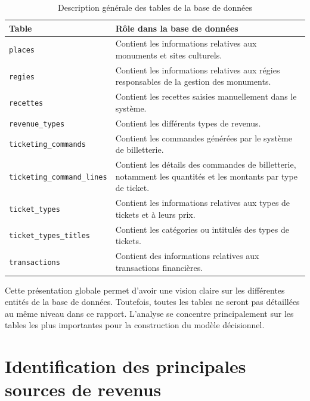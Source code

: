 \documentclass[12pt,a4paper]{report}
\begin{document}
\begin{table}[H]
	\centering
	\renewcommand{\arraystretch}{1.3}
	\begin{tabular}{|p{5cm}|p{9cm}|}
		\hline
		\textbf{Table} & \textbf{Rôle dans la base de données} \\
		\hline
		\texttt{places} & Contient les informations relatives aux monuments et sites culturels. \\
		\hline
		\texttt{regies} & Contient les informations relatives aux régies responsables de la gestion des monuments. \\
		\hline
		\texttt{recettes} & Contient les recettes saisies manuellement dans le système. \\
		\hline
		\texttt{revenue\_types} & Contient les différents types de revenus. \\
		\hline
		\texttt{ticketing\_commands} & Contient les commandes générées par le système de billetterie. \\
		\hline
		\texttt{ticketing\_command\_lines} & Contient les détails des commandes de billetterie, notamment les quantités et les montants par type de ticket. \\
		\hline
		\texttt{ticket\_types} & Contient les informations relatives aux types de tickets et à leurs prix. \\
		\hline
		\texttt{ticket\_types\_titles} & Contient les catégories ou intitulés des types de tickets. \\
		\hline
		\texttt{transactions} & Contient des informations relatives aux transactions financières. \\
		\hline
	\end{tabular}
	\caption{Description générale des tables de la base de données}
	\label{tab:description_tables}
\end{table}

Cette présentation globale permet d’avoir une vision claire sur les différentes entités de la base de données. Toutefois, toutes les tables ne seront pas détaillées au même niveau dans ce rapport. L’analyse se concentre principalement sur les tables les plus importantes pour la construction du modèle décisionnel.


\section{Identification des principales sources de revenus}
\end{document}
